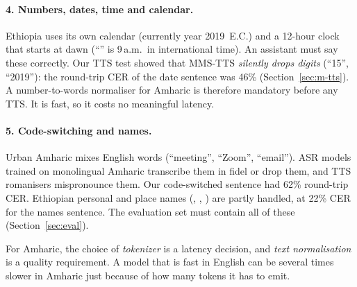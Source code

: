 \paragraph{4. Numbers, dates, time and calendar.}
Ethiopia uses its own calendar (currently year 2019~E.C.) and a 12-hour clock that starts at dawn
(``'' is 9\,a.m.\ in international time). An assistant must say these correctly. Our
TTS test showed that MMS-TTS \emph{silently drops digits} (``15'', ``2019''): the round-trip CER of the
date sentence was 46\% (Section~\ref{sec:m-tts}). A number-to-words normaliser for Amharic is
therefore mandatory before any TTS. It is fast, so it costs no meaningful latency.

\paragraph{5. Code-switching and names.}
Urban Amharic mixes English words (``meeting'', ``Zoom'', ``email''). ASR models trained on
monolingual Amharic transcribe them in fidel or drop them, and TTS romanisers mispronounce them.
Our code-switched sentence had 62\% round-trip CER. Ethiopian personal and place names (, , ) are partly handled, at 22\% CER for the names sentence. The
evaluation set must contain all of these (Section~\ref{sec:eval}).

\begin{finding}
For Amharic, the choice of \emph{tokenizer} is a latency decision, and \emph{text normalisation} is a
quality requirement. A model that is fast in English can be several times slower in Amharic just
because of how many tokens it has to emit.
\end{finding}
